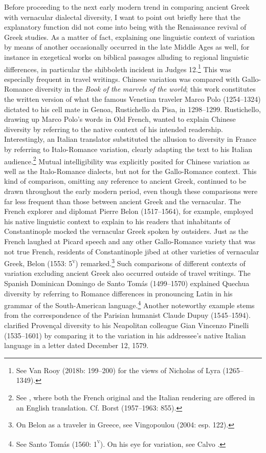 Before proceeding to the next early modern trend in comparing ancient Greek with vernacular dialectal diversity, I want to point out briefly here that the explanatory function did not come into being with the Renaissance revival of Greek studies. As a matter of fact, explaining one linguistic context of variation by means of another occasionally occurred in the late Middle Ages as well, for instance in exegetical works on biblical passages alluding to regional linguistic differences, in particular the shibboleth incident in Judges 12.\footnote{See Van Rooy (2018b: 199–200) for the views of Nicholas of Lyra (1265–1349).} This was especially frequent in travel writings. Chinese variation was compared with Gallo-Romance diversity in the \textit{Book} \textit{of} \textit{the} \textit{marvels} \textit{of} \textit{the} \textit{world}; this work constitutes the written version of what the famous Venetian traveler Marco Polo (1254–1324) dictated to his cell mate in Genoa, Rustichello da Pisa, in 1298–1299. Rustichello, drawing up Marco Polo’s words in Old French, wanted to explain Chinese diversity by referring to the native context of his intended readership. Interestingly, an Italian translator substituted the allusion to diversity in France by referring to Italo-Romance variation, clearly adapting the text to his Italian audience.\footnote{See \citet[157]{Polo1938}, where both the French original and the Italian rendering are offered in an English translation. Cf. Borst (1957–1963: 855).} Mutual intelligibility was explicitly posited for Chinese variation as well as the Italo-Romance dialects, but not for the Gallo-Romance context. This kind of comparison, omitting any reference to ancient Greek, continued to be drawn throughout the early modern period, even though these comparisons were far less frequent than those between ancient Greek and the vernacular. The French explorer and diplomat Pierre Belon (1517–1564), for example, employed his native linguistic context to explain to his readers that inhabitants of Constantinople mocked the vernacular Greek spoken by outsiders. Just as the French laughed at Picard speech and any other Gallo-Romance variety that was not true French, residents of Constantinople jibed at other varieties of vernacular Greek, Belon (1553: 5\textsc{\textsuperscript{v}}) remarked.\footnote{On Belon as a traveler in Greece, see Vingopoulou (2004: esp. 122).} Such comparisons of different contexts of variation excluding ancient Greek also occurred outside of travel writings. The Spanish Dominican Domingo de Santo Tomás (1499–1570) explained Quechua diversity by referring to Romance differences in pronouncing Latin in his grammar of the South-American language.\footnote{See Santo Tomás (1560: 1\textsc{\textsuperscript{v}}). On his eye for variation, see Calvo \citet[140]{Pérez2005}.} Another noteworthy example stems from the correspondence of the Parisian humanist Claude Dupuy (1545–1594). \citet[274]{Dupuy2001} clarified Provençal diversity to his Neapolitan colleague Gian Vincenzo Pinelli (1535–1601) by comparing it to the variation in his addressee’s native Italian language in a letter dated December 12, 1579.

